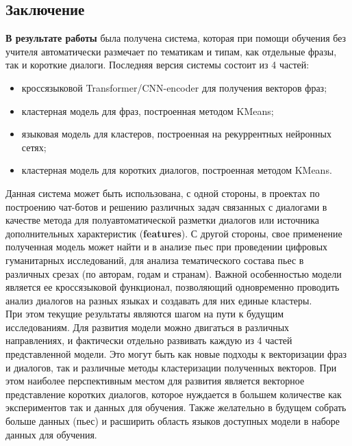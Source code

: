 \documentclass[a4paper,14pt]{article}
\begin{document}
\begin{center}
	\section*{Заключение}
\end{center}
\begin{justify}
\textbf{В результате работы} была получена система, которая при помощи обучения без учителя автоматически размечает по тематикам и типам, как отдельные фразы, так и короткие диалоги. Последняя версия системы состоит из 4 частей:
\begin{itemize}
  \item кросс­языковой Transformer/CNN­-encoder для получения векторов фраз; 
  \item кластерная модель для фраз, построенная методом KMeans;
  \item языковая модель для кластеров, построенная на рекуррентных нейронных сетях;
  \item кластерная модель для коротких диалогов, построенная методом KMeans.
 \end{itemize}
 \indent
 Данная система может быть использована, с одной стороны, в проектах по построению чат-ботов и решению различных задач связанных с диалогами в качестве метода для полуавтоматической разметки диалогов или источника дополнительных характеристик (\textbf{features}). С другой стороны, свое применение полученная модель может найти и в анализе пьес при проведении цифровых гуманитарных исследований, для анализа тематического состава пьес в различных срезах (по авторам, годам и странам). Важной особенностью модели является ее кроссязыковой функционал, позволяющий одновременно проводить анализ диалогов на разных языках и создавать для них единые кластеры. \\
\indent
При этом текущие результаты являются шагом на пути к будущим исследованиям. Для развития модели можно двигаться в различных направлениях, и фактически отдельно развивать каждую из 4 частей представленной модели. Это могут быть как новые подходы к векторизации фраз и диалогов, так и различные методы кластеризации полученных векторов. При этом наиболее перспективным местом для развития является векторное представление коротких диалогов, которое нуждается в большем количестве как экспериментов так и данных для обучения. Также желательно в будущем собрать больше данных (пьес) и расширить область языков доступных модели в наборе данных для обучения.
\end{justify}
\pagebreak
\end{document}
